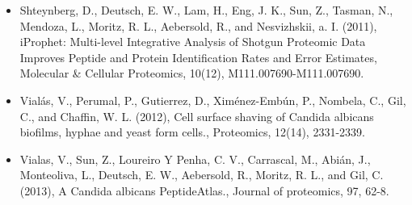 \begin{itemize}
\item[]{%
Shteynberg, D., Deutsch, E. W., Lam, H., Eng, J. K., Sun, Z., Tasman, N., Mendoza, L., Moritz,
R. L., Aebersold, R., and Nesvizhskii, a. I. (2011), iProphet: Multi-level Integrative Analysis
of Shotgun Proteomic Data Improves Peptide and Protein Identification Rates and Error
Estimates, Molecular \& Cellular Proteomics, 10(12), M111.007690-M111.007690.
}


\item[]{%
Vial\'as, V., Perumal, P., Gutierrez, D., Xim\'enez-Emb\'un, P., Nombela, C., Gil, C., and Chaffin,
W. L. (2012), Cell surface shaving of Candida albicans biofilms, hyphae and yeast form
cells., Proteomics, 12(14), 2331-2339.
}

\item[]{%
Vialas, V., Sun, Z., Loureiro Y Penha, C. V., Carrascal, M., Abián, J., Monteoliva, L., Deutsch,
E. W., Aebersold, R., Moritz, R. L., and Gil, C. (2013), A Candida albicans PeptideAtlas.,
Journal of proteomics, 97, 62-8.
}


\end{itemize}
